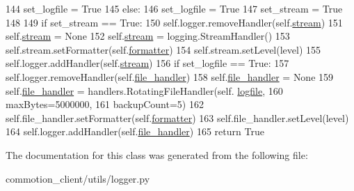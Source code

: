 \begin{DoxyCode}
144             set\_logfile = \textcolor{keyword}{True}
145         \textcolor{keywordflow}{else}:
146             set\_logfile = \textcolor{keyword}{True}
147             set\_stream = \textcolor{keyword}{True}
148 
149         \textcolor{keywordflow}{if} set\_stream == \textcolor{keyword}{True}:
150             self.logger.removeHandler(self.\hyperlink{classcommotion__client_1_1utils_1_1logger_1_1LogHandler_a83d51d996fcf161a5b107a2589f96966}{stream})
151             self.\hyperlink{classcommotion__client_1_1utils_1_1logger_1_1LogHandler_a83d51d996fcf161a5b107a2589f96966}{stream} = \textcolor{keywordtype}{None}
152             self.\hyperlink{classcommotion__client_1_1utils_1_1logger_1_1LogHandler_a83d51d996fcf161a5b107a2589f96966}{stream} = logging.StreamHandler()
153             self.stream.setFormatter(self.\hyperlink{classcommotion__client_1_1utils_1_1logger_1_1LogHandler_adbe12df7374590dd37a12eb84ee48a41}{formatter})
154             self.stream.setLevel(level)
155             self.logger.addHandler(self.\hyperlink{classcommotion__client_1_1utils_1_1logger_1_1LogHandler_a83d51d996fcf161a5b107a2589f96966}{stream})
156         \textcolor{keywordflow}{if} set\_logfile == \textcolor{keyword}{True}:
157             self.logger.removeHandler(self.\hyperlink{classcommotion__client_1_1utils_1_1logger_1_1LogHandler_afe5e88e544dd8855d6d1b52255e6d531}{file\_handler})
158             self.\hyperlink{classcommotion__client_1_1utils_1_1logger_1_1LogHandler_afe5e88e544dd8855d6d1b52255e6d531}{file\_handler} = \textcolor{keywordtype}{None}
159             self.\hyperlink{classcommotion__client_1_1utils_1_1logger_1_1LogHandler_afe5e88e544dd8855d6d1b52255e6d531}{file\_handler} = handlers.RotatingFileHandler(self.
      \hyperlink{classcommotion__client_1_1utils_1_1logger_1_1LogHandler_a92d313ddde96b6e1765514f4596f26f2}{logfile},
160                                                             maxBytes=5000000,
161                                                             backupCount=5)
162             self.file\_handler.setFormatter(self.\hyperlink{classcommotion__client_1_1utils_1_1logger_1_1LogHandler_adbe12df7374590dd37a12eb84ee48a41}{formatter})
163             self.file\_handler.setLevel(level)
164             self.logger.addHandler(self.\hyperlink{classcommotion__client_1_1utils_1_1logger_1_1LogHandler_afe5e88e544dd8855d6d1b52255e6d531}{file\_handler})
165         \textcolor{keywordflow}{return} \textcolor{keyword}{True}

\end{DoxyCode}


The documentation for this class was generated from the following file\-:\begin{DoxyCompactItemize}
\item 
commotion\-\_\-client/utils/logger.\-py\end{DoxyCompactItemize}
